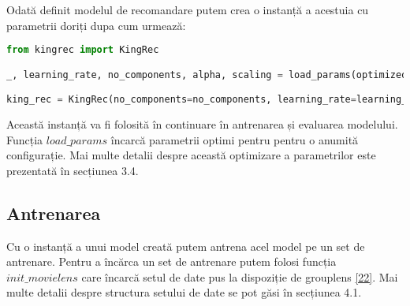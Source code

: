 Odată definit modelul de recomandare putem crea o instanță a acestuia cu parametrii doriți dupa cum urmează:
\begin{lstlisting}[language=Python, caption=\textit{Instanțierea unui model}]
from kingrec import KingRec

_, learning_rate, no_components, alpha, scaling = load_params(optimized_for='auc_clusters')

king_rec = KingRec(no_components=no_components, learning_rate=learning_rate, alpha=alpha, scale=scaling, loss='warp')
\end{lstlisting}
Această instanță va fi folosită în continuare în antrenarea și evaluarea modelului.
Funcția $load\_params$ încarcă parametrii optimi pentru pentru o anumită configurație. Mai multe detalii despre această optimizare a parametrilor este prezentată în secțiunea 3.4.

\subsection{Antrenarea}
Cu o instanță a unui model creată putem antrena acel model pe un set de antrenare. Pentru a încărca un set de antrenare putem folosi funcția $init\_movielens$ care încarcă setul de date pus la dispoziție de grouplens \hyperlink{movielens}{[22]}. Mai multe detalii despre structura setului de date se pot găsi în secțiunea 4.1.

